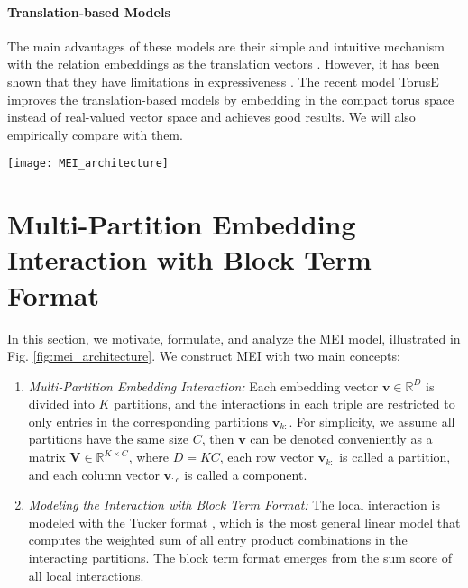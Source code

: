 \documentclass{ecai}
\def\vv{{\bm{v}}}
\def\mV{{\bm{V}}}
\def\sR{{\mathbb{R}}}
\theoremstyle{plain}  \newtheorem{thm}{Theorem}  \newtheorem{lem}[thm]{Lemma}  \newtheorem{prop}[thm]{Proposition}
\theoremstyle{remark}  \newtheorem*{rem}{Remark}
\begin{document}
\paragraph{Translation-based Models}
The main advantages of these models are their simple and intuitive mechanism with the relation embeddings as the translation vectors \cite{bordes_translatingembeddingsmodeling_2013}. However, it has been shown that they have limitations in expressiveness \cite{kazemi_simpleembeddinglink_2018}. The recent model TorusE \cite{ebisu_toruseknowledgegraph_2018} improves the translation-based models by embedding in the compact torus space instead of real-valued vector space and achieves good results. We will also empirically compare with them.


\begin{figure*}[t]
	\centering
	\texttt{[image: MEI\_architecture]}
	\caption{MEI architecture: multi-partition embedding vectors that interact only between the corresponding partitions. This figure illustrates a MEI model with block term format in three different views for the local-partition interaction: Tucker format, parameterized bilinear format, and neural network format.}
	\label{fig:mei_architecture}
\end{figure*}

\section{Multi-Partition Embedding Interaction with Block Term Format} \label{sect:model} In this section, we motivate, formulate, and analyze the MEI model, illustrated in Fig. \ref{fig:mei_architecture}. We construct MEI with two main concepts: 
\begin{enumerate}
	\item \textit{Multi-Partition Embedding Interaction:} Each embedding vector $ \vv \in \sR^D $ is divided into $ K $ partitions, and the interactions in each triple are restricted to only entries in the corresponding partitions $ \vv_{k:} $. For simplicity, we assume all partitions have the same size $ C $, then $ \vv $ can be denoted conveniently as a matrix $ \mV \in \sR^{K \times C} $, where $ D = KC $, each row vector $ \vv_{k:} $ is called a partition, and each column vector $ \vv_{:c} $ is called a component. 

	\item \textit{Modeling the Interaction with Block Term Format:} The local interaction is modeled with the Tucker format \cite{tucker_mathematicalnotesthreemode_1966}, which is the most general linear model that computes the weighted sum of all entry product combinations in the interacting partitions. The block term format \cite{delathauwer_decompositionshigherordertensor_2008a} emerges from the sum score of all local interactions.
\end{enumerate}
\end{document}
